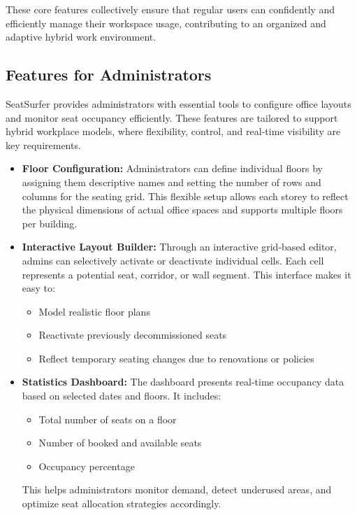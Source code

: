 \documentclass[12pt,a4paper]{report} %
\begin{document}
These core features collectively ensure that regular users can confidently and efficiently manage their workspace usage, contributing to an organized and adaptive hybrid work environment.

\subsection{Features for Administrators}

SeatSurfer provides administrators with essential tools to configure office layouts and monitor seat occupancy efficiently. These features are tailored to support hybrid workplace models, where flexibility, control, and real-time visibility are key requirements.

\begin{itemize}
    \item \textbf{Floor Configuration:}  
    Administrators can define individual floors by assigning them descriptive names and setting the number of rows and columns for the seating grid. This flexible setup allows each storey to reflect the physical dimensions of actual office spaces and supports multiple floors per building.

    \item \textbf{Interactive Layout Builder:}  
    Through an interactive grid-based editor, admins can selectively activate or deactivate individual cells. Each cell represents a potential seat, corridor, or wall segment. This interface makes it easy to:
    \begin{itemize}
        \item Model realistic floor plans
        \item Reactivate previously decommissioned seats
        \item Reflect temporary seating changes due to renovations or policies
    \end{itemize}

    \item \textbf{Statistics Dashboard:}  
    The dashboard presents real-time occupancy data based on selected dates and floors. It includes:
    \begin{itemize}
        \item Total number of seats on a floor
        \item Number of booked and available seats
        \item Occupancy percentage
    \end{itemize}
    This helps administrators monitor demand, detect underused areas, and optimize seat allocation strategies accordingly.
\end{itemize}
\end{document}
